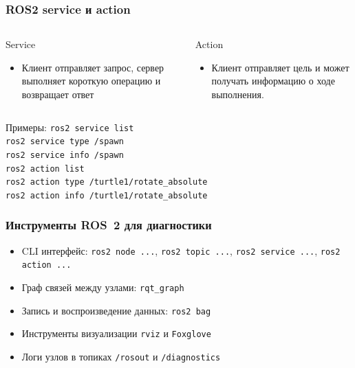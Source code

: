 \documentclass[aspectratio=169]{beamer}
\newcommand{\cmd}[1]{\texttt{#1}}
\begin{document}
\begin{frame}
\frametitle{ROS2 service и action}
\begin{columns}[T]
\begin{block}{Service}
\small
\begin{itemize}
	\item Клиент отправляет запрос, сервер выполняет короткую операцию и возвращает ответ
\end{itemize}
\end{block}
\begin{block}{Action}
\small
\begin{itemize}
\item Клиент отправляет цель и может получать информацию о ходе выполнения.
\end{itemize}
\end{block}
\end{columns}
\vfill
\begin{block}{Примеры:}
\small
\cmd{ros2 service list} \\
\cmd{ros2 service type /spawn} \\
\cmd{ros2 service info /spawn} \\
\vspace{5pt}
\cmd{ros2 action list}\\
\cmd{ros2 action type /turtle1/rotate\_absolute}\\
\cmd{ros2 action info /turtle1/rotate\_absolute}
\end{block}
\end{frame}

\begin{frame}
\frametitle{Инструменты ROS~2 для диагностики}
\begin{itemize}
	\item CLI интерфейс: \cmd{ros2 node ...}, \cmd{ros2 topic ...}, \cmd{ros2 service ...}, \cmd{ros2 action ...}
	\item Граф связей между узлами: \cmd{rqt\_graph}
	\item Запись и воспроизведение данных: \cmd{ros2 bag}
	\item Инструменты визуализации \cmd{rviz} и \cmd{Foxglove}
	\item Логи узлов в топиках \cmd{/rosout} и \cmd{/diagnostics}
\end{itemize}

\end{frame}
\end{document}
